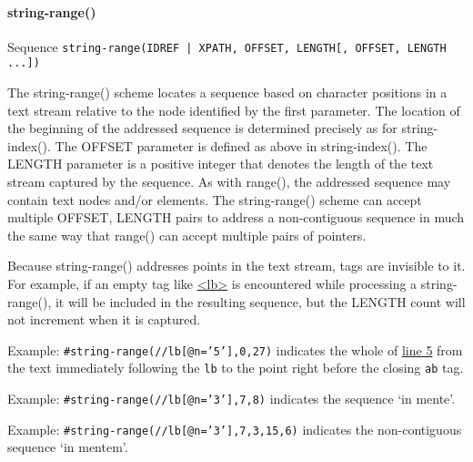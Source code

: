 \paragraph[{string-range()}]{string-range()}\label{SATSSR}\par
Sequence \texttt{string-range(IDREF | XPATH, OFFSET, LENGTH[, OFFSET, LENGTH ...])}\par
The string-range() scheme locates a sequence based on character positions in a text stream relative to the node identified by the first parameter. The location of the beginning of the addressed sequence is determined precisely as for  {\name string-index()}. The OFFSET parameter is defined as above in  {\name string-index()}. The LENGTH parameter is a positive integer that denotes the length of the text stream captured by the sequence. As with  {\name range()}, the addressed sequence may contain text nodes and/or elements. The  {\name string-range()} scheme can accept multiple OFFSET, LENGTH pairs to address a non-contiguous sequence in much the same way that range() can accept multiple pairs of pointers.\par
Because string-range() addresses points in the text stream, tags are invisible to it. For example, if an empty tag like \hyperref[TEI.lb]{<lb>} is encountered while processing a string-range(), it will be included in the resulting sequence, but the LENGTH count will not increment when it is captured.\par
Example: \texttt{\#string-range(//lb[@n='5'],0,27)} indicates the whole of \hyperref[SATSXP-ex]{line 5} from the text immediately following the \texttt{lb} to the point right before the closing \texttt{ab} tag.\par
Example: \texttt{\#string-range(//lb[@n='3'],7,8)} indicates the sequence ‘in mente’.\par
Example: \texttt{\#string-range(//lb[@n='3'],7,3,15,6)} indicates the non-contiguous sequence ‘in mentem’.
